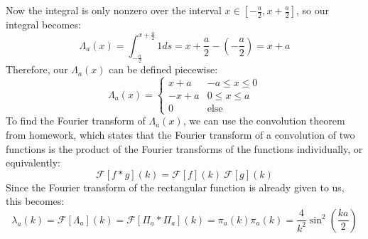 \documentclass[10pt]{article}
\begin{document}
\begin{enumerate}[label=\alph*)]
\begin{solution}
\begin{center}
			\end{center}
			Now the integral is only nonzero over the interval $x \in [-\frac{a}{2},x+ \frac{a}{2}]$, so our integral
			becomes:
			\[
				\Lambda_a(x) = \int_{-\frac{a}{2}}^{x + \frac{a}{2}} 1 ds = x + \frac{a}{2} - \left( -\frac{a}{2} \right) = x + a
			\] 
			Therefore, our $\Lambda_a(x)$ can be defined piecewise:
			\[
			\Lambda_a(x) = \begin{cases}
				x + a & -a \le x \le 0 \\ 
				-x + a& 0 \le x \le a\\
				0 & \text{else}
			\end{cases}
			\] 
			To find the Fourier transform of $\Lambda_a(x)$, we can use the convolution theorem from homework, 
			which states that the Fourier transform of a convolution of two functions is the product of the Fourier 
			transforms of the functions individually, or equivalently:
			\[
				\mathcal F[f \ast g](k) = \mathcal F[f](k) \  \mathcal F[g](k)
			\] 
			Since the Fourier transform of the rectangular function is already given to us, this becomes: 
			\[
				\lambda_a(k) = \mathcal F[\Lambda_a](k) = \mathcal F[\Pi_a \ast \Pi_a](k) = \pi_a(k) \pi_a(k)
				 = \frac{4}{k^2}\sin^2\left(\frac{ka}{2}\right)
			\] 
		\end{solution}
		\end{enumerate}
		\pagebreak
\end{document}
